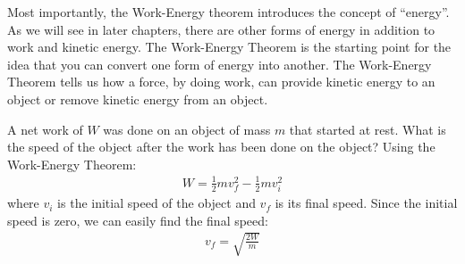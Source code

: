 Most importantly, the Work-Energy theorem introduces the concept of ``energy''. As we will see in later chapters, there are other forms of energy in addition to work and kinetic energy. The Work-Energy Theorem is the starting point for the idea that you can convert one form of energy into another. The Work-Energy Theorem tells us how a force, by doing work, can provide kinetic energy to an object or remove kinetic energy from an object.  

\begin{example}{A net work of $W$ was done on an object of mass $m$ that started at rest. What is the speed of the object after the work has been done on the object?}
Using the Work-Energy Theorem:
\begin{align*}
W = \frac{1}{2}mv_f^2 - \frac{1}{2}mv_i^2
\end{align*}
where $v_i$ is the initial speed of the object and $v_f$ is its final speed. Since the initial speed is zero, we can easily find the final speed:
\begin{align*}
v_f = \sqrt{\frac{2W}{m}}
\end{align*}
\end{example}


